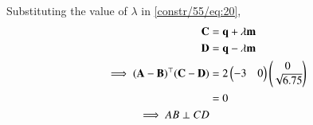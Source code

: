 Substituting the value of $\lambda$ in \eqref{constr/55/eq:20},
\begin{align}
\mathbf{C}&=\mathbf{q}+\lambda\mathbf{m}\\
\mathbf{D}&=\mathbf{q}-\lambda\mathbf{m} \\
\implies (\mathbf{A}-\mathbf{B})^{\top}(\mathbf{C}-\mathbf{D})
&=2\begin{pmatrix}-3&0\end{pmatrix}\begin{pmatrix}0\\\sqrt{6.75}\end{pmatrix}
\\
&=0
\\
\implies AB\perp CD
\end{align}



